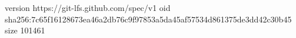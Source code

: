 version https://git-lfs.github.com/spec/v1
oid sha256:7c65f16128673ea46a2db76c9f97853a5da45af57534d861375de3dd42c30b45
size 101461
